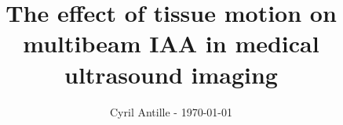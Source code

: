 \documentclass[a4paper,UKenglish]{modules/ifimaster}
\author{Cyril Antille - \today}
\title{The effect of tissue motion on multibeam IAA in medical ultrasound imaging}
\begin{document}
    \masterfrontpage
    
    
    \frontmatter{}
    
    
    \tableofcontents{}
    \listoffigures{}
    \listoftables{}
    
    \mainmatter{}
    
    
    
    
    
    
    
    
    
    
    \backmatter{}
    
\end{document}
